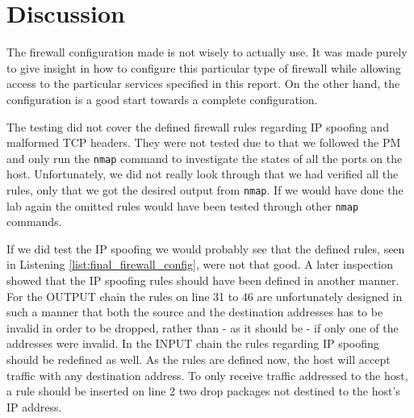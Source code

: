 \section{Discussion} 
\label{sec:discussion}

The firewall configuration made is not wisely to actually use. It was made purely to give insight in how to configure this particular type of firewall while allowing access to the particular services specified in this report. On the other hand, the configuration is a good start towards a complete configuration.

The testing did not cover the defined firewall rules regarding IP spoofing and malformed TCP headers. They were not tested due to that we followed the \lab{} PM and only run the \texttt{nmap} command to investigate the states of all the ports on the host. Unfortunately, we did not really look through that we had verified all the rules, only that we got the desired output from \texttt{nmap}. If we would have done the lab again the omitted rules would have been tested through other \texttt{nmap} commands. 

If we did test the IP spoofing we would probably see that the defined rules, seen in Listening \ref{list:final_firewall_config}, were not that good. A later inspection showed that the IP spoofing rules should have been defined in another manner. For the OUTPUT chain the rules on line 31 to 46 are unfortunately designed in such a manner that both the source and the destination addresses has to be invalid in order to be dropped, rather than - as it should be - if only one of the addresses were invalid. In the INPUT chain the rules regarding IP spoofing should be redefined as well. As the rules are defined now, the host will accept traffic with any destination address. To only receive traffic addressed to the host, a rule should be inserted on line 2 two drop packages not destined to the host's IP address.